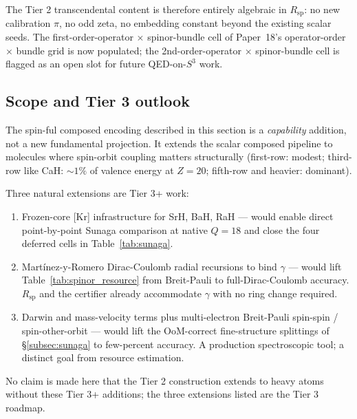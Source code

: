 The Tier 2 transcendental content is therefore entirely algebraic in
$R_{\mathrm{sp}}$: no new calibration $\pi$, no odd zeta, no
embedding constant beyond the existing scalar seeds. The
first-order-operator $\times$ spinor-bundle cell of Paper~18's
operator-order $\times$ bundle grid is now populated; the
2nd-order-operator $\times$ spinor-bundle cell is flagged as an open
slot for future QED-on-$S^3$ work.

\subsection{Scope and Tier 3 outlook}
\label{subsec:spinor_scope}

The spin-ful composed encoding described in this section is a
\emph{capability} addition, not a new fundamental projection. It
extends the scalar composed pipeline to molecules where spin-orbit
coupling matters structurally (first-row: modest; third-row like CaH:
$\sim 1\%$ of valence energy at $Z=20$; fifth-row and heavier:
dominant).

Three natural extensions are Tier 3+ work:
\begin{enumerate}
  \item Frozen-core [Kr] infrastructure for SrH, BaH, RaH — would
    enable direct point-by-point Sunaga comparison at native $Q = 18$
    and close the four deferred cells in Table~\ref{tab:sunaga}.
  \item Martínez-y-Romero Dirac-Coulomb radial recursions to bind
    $\gamma$ — would lift Table~\ref{tab:spinor_resource} from
    Breit-Pauli to full-Dirac-Coulomb accuracy. $R_{\mathrm{sp}}$ and
    the certifier already accommodate $\gamma$ with no ring change
    required.
  \item Darwin and mass-velocity terms plus multi-electron
    Breit-Pauli spin-spin / spin-other-orbit — would lift the
    OoM-correct fine-structure splittings of \S\ref{subsec:sunaga} to
    few-percent accuracy. A production spectroscopic tool; a distinct
    goal from resource estimation.
\end{enumerate}

No claim is made here that the Tier 2 construction extends to heavy
atoms without these Tier 3+ additions; the three extensions listed
are the Tier 3 roadmap.
